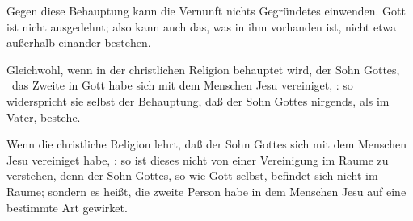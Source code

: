Gegen diese Behauptung kann die Vernunft nichts Gegründetes einwenden. Gott ist nicht ausgedehnt; also kann auch das, was in ihm vorhanden ist, nicht etwa außerhalb einander bestehen.\par
{} Gleichwohl, wenn in der christlichen Religion behauptet wird, der Sohn Gottes, \dh\ das Zweite in Gott habe sich mit dem Menschen Jesu vereiniget, \usw : so widerspricht sie selbst der Behauptung, daß der Sohn Gottes nirgends, als im Vater, bestehe.~\par
{} Wenn die christliche Religion lehrt, daß der Sohn Gottes sich mit dem Menschen Jesu vereiniget habe, \usw : so ist dieses nicht von einer Vereinigung im Raume zu verstehen, denn der Sohn Gottes, so wie Gott selbst, befindet sich nicht im Raume; sondern es heißt, die zweite Person habe in dem Menschen Jesu auf eine bestimmte Art gewirket.

